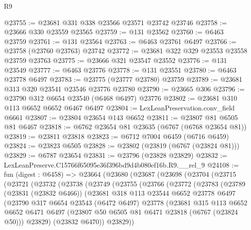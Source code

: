 \begin{lexlean}{R9}
\begin{coremodule}
@23755 := @23681 @331 @338 @23566 @23571 @23742 @23746
@23758 := @23666 @330 @23559 @23565
@23759 := @131 @23562
@23760 := @6463 @23759
@23761 := @131 @23564
@23763 := @6463 @23761 @6497
@23766 := @23758 (@23760 @23763) @23742
@23772 := @23681 @322 @329 @23553 @23558 @23759 @23763
@23775 := @23666 @321 @23547 @23552
@23776 := @131 @23549
@23777 := @6463 @23776
@23778 := @131 @23551
@23780 := @6463 @23778 @6497
@23783 := @23775 (@23777 @23780) @23759
@23789 := @23681 @313 @320 @23541 @23546 @23776 @23780
@23790 := @23665 @306
@23796 := @23790 @312 @6654 @23540 (@6468 @6497) @23776
@23802 := @23681 @310 @113 @6652 @6652 @6467 @6497
@23804 := LexLeanPreservation.conv_field @6661
@23807 := @23804 @23654 @143 @6652
@23811 := @23807 @81 @6505 @81 @6467
@23818 := @6762 @23654 @81 @23635 (@6767 (@6768 @23654 @81))
@23819 := @23811 @23818
@23823 := @6712 @7004 @6459 (@6716 @6459)
@23824 := @23823 @6505
@23828 := @23802 (@23819 (@6767 (@23824 @81)))
@23829 := @6787 @23654
@23831 := @23796 (@23828 @23829)
@23832 := LexLeanPreserve.C15766f65095e36f396bd9d4b080ef16b.R9.__rel_9
@24108 := fun (digest : @6458) =>
  @23664
    (@23680
      (@23687
        (@23698
          (@23704
            (@23715
              (@23721
                (@23732
                  (@23738
                    (@23749
                      (@23755
                        (@23766
                          (@23772
                            (@23783
                              (@23789
                                (@23831 (@23832 @6466))
                                (@23681
                                  @318
                                  @113
                                  @23544
                                  @6652
                                  @23778
                                  @6497
                                  (@23790
                                    @317
                                    @6654
                                    @23543
                                    (@6472 @6497)
                                    @23778
                                    (@23681
                                      @315
                                      @113
                                      @6652
                                      @6652
                                      @6471
                                      @6497
                                      (@23807 @50 @6505 @81 @6471 @23818 (@6767 (@23824 @50)))
                                      @23829)
                                    (@23832 @6470))
                                  @23829))

\end{coremodule}
\end{lexlean}
